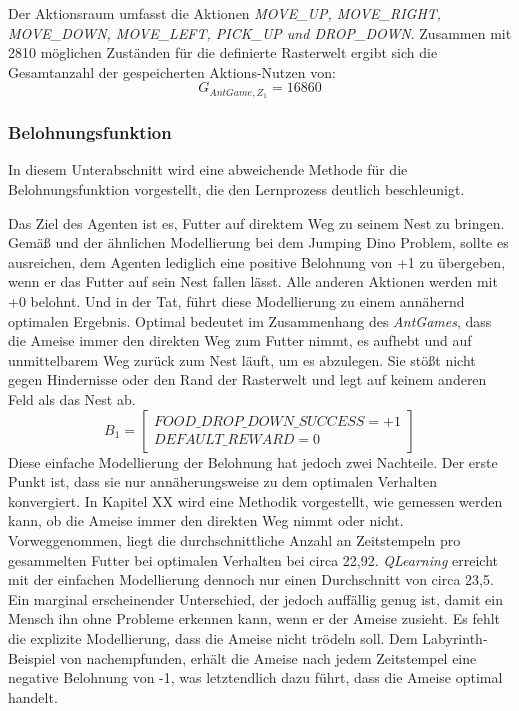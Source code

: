 Der Aktionsraum umfasst die Aktionen \textit{MOVE\_UP, MOVE\_RIGHT,
MOVE\_DOWN,
MOVE\_LEFT,
PICK\_UP und
DROP\_DOWN}. Zusammen mit 2810 möglichen Zuständen für die definierte Rasterwelt ergibt sich die Gesamtanzahl der gespeicherten Aktions-Nutzen von:
\begin{equation}
    G_{AntGame,Z_1} = 16860
\end{equation}

\subsubsection{Belohnungsfunktion}
In diesem Unterabschnitt wird eine abweichende Methode für die Belohnungsfunktion vorgestellt, die den Lernprozess deutlich beschleunigt.
\par
Das Ziel des Agenten ist es, Futter auf direktem Weg zu seinem Nest zu bringen. Gemäß \cite{Sutton1998} und der ähnlichen Modellierung bei dem Jumping Dino Problem, sollte es ausreichen, dem Agenten lediglich eine positive Belohnung von +1 zu übergeben, wenn er das Futter auf sein Nest fallen lässt. Alle anderen Aktionen werden mit +0 belohnt. Und in der Tat, führt diese Modellierung zu einem annähernd optimalen Ergebnis. \glqq Optimal\grqq{} bedeutet im Zusammenhang des \textit{AntGames}, dass die Ameise immer den direkten Weg zum Futter nimmt, es aufhebt und auf unmittelbarem Weg zurück zum Nest läuft, um es abzulegen. Sie stößt nicht gegen Hindernisse oder den Rand der Rasterwelt und legt auf keinem anderen Feld als das Nest ab.
\begin{equation}
    B_{1} =  \begin{bmatrix} 
        FOOD\_DROP\_DOWN\_SUCCESS = +1\\
        DEFAULT\_REWARD = 0           
 \end{bmatrix}
\end{equation}
Diese einfache Modellierung der Belohnung hat jedoch zwei Nachteile. Der erste Punkt ist, dass sie nur annäherungsweise zu dem optimalen Verhalten konvergiert. In Kapitel XX wird eine Methodik vorgestellt, wie gemessen werden kann, ob die Ameise immer den direkten Weg nimmt oder nicht. Vorweggenommen, liegt die durchschnittliche Anzahl an Zeitstempeln pro gesammelten Futter bei optimalen Verhalten bei circa 22,92. \textit{QLearning} erreicht mit der einfachen Modellierung dennoch nur einen Durchschnitt von circa 23,5. Ein marginal erscheinender Unterschied, der jedoch auffällig genug ist, damit ein Mensch ihn ohne Probleme erkennen kann, wenn er der Ameise zusieht. Es fehlt die explizite Modellierung, dass die Ameise nicht \glqq trödeln\grqq{} soll. Dem Labyrinth-Beispiel von \cite{Sutton1998} nachempfunden, erhält die Ameise nach jedem Zeitstempel eine negative Belohnung von -1, was letztendlich dazu führt, dass die Ameise optimal handelt.
